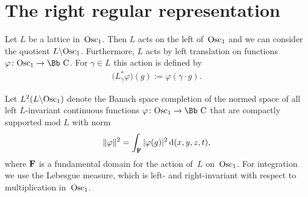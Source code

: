 \documentclass[10pt,a4paper]{amsart}
\newcommand\CC{{\mbox{\Bb C}}}
\newcommand\bF{\textbf{{\rm \textbf{F}}}}
\newcommand\ph{\varphi}
\newcommand{\Osc}{{\rm Osc}}
\numberwithin{equation}{section}
\begin{document}
\section{The right regular representation}

Let $L$ be a lattice in~$\Osc_1$.
Then $L$ acts on the left of~$\Osc_1$ and we can consider the quotient $L\backslash \Osc_1$.
Furthermore, $L$ acts by left translation on functions $\ph\colon \Osc_1\to\CC$. For $\gamma\in L$ this action is defined by
\begin{gather*}
\big(L_\gamma^* \ph\big)(g):=\ph(\gamma\cdot g).
\end{gather*}

Let $L^2(L\backslash \Osc_1)$ denote the Banach space completion of the normed space of all left $L$-invariant continuous functions $\varphi\colon \Osc_1\rightarrow \CC$ that are compactly supported mod $L$ with norm
\begin{gather*}
\lVert\varphi\rVert^2=\int_\bF|\varphi(g)|^2 \,{\rm d}(x,y,z,t),
\end{gather*}
where $\bF$ is a fundamental domain for the action of~$L$ on~$\Osc_1$. For integration we use the Lebesgue measure, which is left- and right-invariant with respect to multiplication in~$\Osc_1$.
\end{document}
